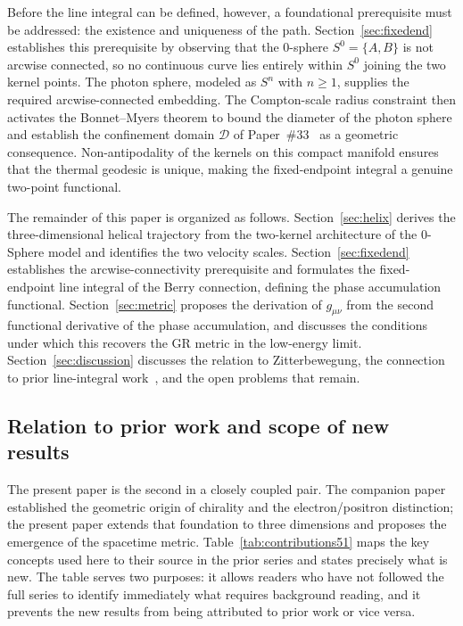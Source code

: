 \documentclass[%
 reprint, amsmath,amssymb, aps, prb, ]{revtex4-2}
\numberwithin{equation}{section}
\begin{document}
Before the line integral can be defined, however, a foundational prerequisite must be addressed: the existence and uniqueness of the path. Section~\ref{sec:fixedend} establishes this prerequisite by observing that the 0-sphere $S^0=\{A,B\}$ is not arcwise connected, so no continuous curve lies entirely within $S^0$ joining the two kernel points. The photon sphere, modeled as $S^n$ with $n\geq 1$, supplies the required arcwise-connected embedding. The Compton-scale radius constraint then activates the Bonnet--Myers theorem to bound the diameter of the photon sphere and establish the confinement domain $\mathcal{D}$ of Paper~\#33~\cite{hanamura33} as a geometric consequence. Non-antipodality of the kernels on this compact manifold ensures that the thermal geodesic is unique, making the fixed-endpoint integral a genuine two-point functional.

The remainder of this paper is organized as follows. Section~\ref{sec:helix} derives the three-dimensional helical trajectory from the two-kernel architecture of the 0-Sphere model and identifies the two velocity scales. Section~\ref{sec:fixedend} establishes the arcwise-connectivity prerequisite and formulates the fixed-endpoint line integral of the Berry connection, defining the phase accumulation functional. Section~\ref{sec:metric} proposes the derivation of $g_{\mu\nu}$ from the second functional derivative of the phase accumulation, and discusses the conditions under which this recovers the GR metric in the low-energy limit. Section~\ref{sec:discussion} discusses the relation to Zitterbewegung, the connection to prior line-integral work~\cite{hanamura29, hanamura30, hanamura31}, and the open problems that remain.

\subsection{Relation to prior work and scope of new results}
\label{subsec:prior_work}

The present paper is the second in a closely coupled pair. The companion paper~\cite{hanamura50} established the geometric origin of chirality and the electron/positron distinction; the present paper extends that foundation to three dimensions and proposes the emergence of the spacetime metric. Table~\ref{tab:contributions51} maps the key concepts used here to their source in the prior series and states precisely what is new. The table serves two purposes: it allows readers who have not followed the full series to identify immediately what requires background reading, and it prevents the new results from being attributed to prior work or vice versa.
\end{document}
